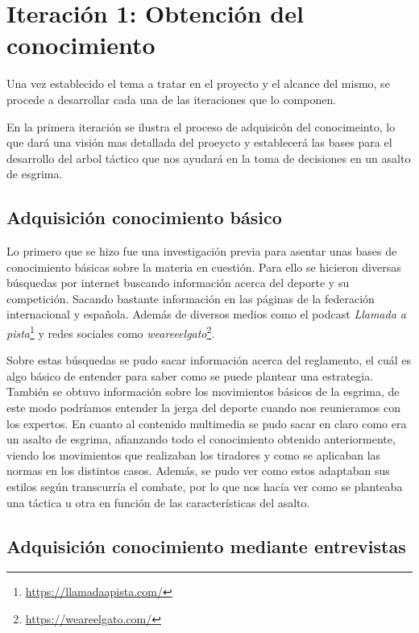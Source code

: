\section{Iteración 1: Obtención del conocimiento}

Una vez establecido el tema a tratar en el proyecto y el alcance del mismo,
se procede a desarrollar cada una de las iteraciones que lo componen.

En la primera iteración se ilustra el proceso de adquisicón del conocimeinto,
lo que dará una visión mas detallada del proeycto y establecerá las bases
para el desarrollo del arbol táctico que nos ayudará en la toma de decisiones en un asalto de esgrima.

\subsection{Adquisición conocimiento básico}

Lo primero que se hizo fue una investigación previa para asentar unas bases de conocimiento
básicas sobre la materia en cuestión. Para ello se hicieron diversas búsquedas por internet
buscando información acerca del deporte y su competición. Sacando bastante información
en las páginas de la federación internacional y española. Además de diversos medios como
el podcast \textit{Llamada a pista}\footnote{\url{https://llamadaapista.com/}} y redes sociales como \textit{weareeelgato}\footnote{\url{https://weareelgato.com/}}.

Sobre estas búsquedas se pudo sacar información acerca del reglamento, el cuál es algo
básico de entender para saber como se puede plantear una estrategia. También se obtuvo
información sobre los movimientos básicos de la esgrima, de este modo podríamos entender
la jerga del deporte cuando nos reunieramos con los expertos. En cuanto al contenido
multimedia se pudo sacar en claro como era un asalto de esgrima, afianzando todo el conocimiento
obtenido anteriormente, viendo los movimientos que realizaban los tiradores y como
se aplicaban las normas en los distintos casos. Además, se pudo ver como estos adaptaban
sus estilos según transcurría el combate, por lo que nos hacía ver como se planteaba
una táctica u otra en función de las características del asalto.

\subsection{Adquisición conocimiento mediante entrevistas}

